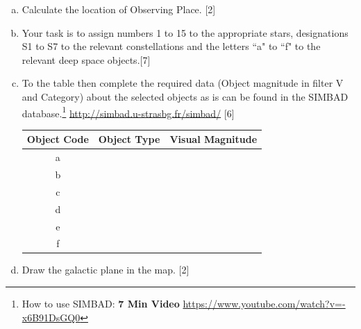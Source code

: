 \documentclass[a4paper,12pt]{extarticle}
\begin{document}
\begin{enumerate}[a.]
	\item Calculate the location of Observing Place. \hfill[2]
	\item Your task is to assign numbers 1 to 15 to the appropriate stars, designations S1 to S7 to the relevant constellations and the letters ``a" to ``f" to the relevant deep space objects.\hfill[7]
	\item To the table then complete the required data (Object magnitude in filter V and Category) about the selected objects as is can be found in the SIMBAD database.\footnote{How to use SIMBAD: \textbf{7 Min Video} \url{https://www.youtube.com/watch?v=-x6B91DsGQ0}} \url{http://simbad.u-strasbg.fr/simbad/} \hfill[6]
	
	\begin{table}[H]
		\centering
		\begin{tabular}{|c|l|l|}
			\hline
			\multicolumn{1}{|l|}{Object Code} & Object Type & Visual Magnitude \\ \hline
			a                                 &             &                  \\
			b                                 &             &                  \\
			c                                 &             &                  \\
			d                                 &             &                  \\
			e                                 &             &                  \\
			f                                 &             &                  \\ \hline
		\end{tabular}
	\end{table}
	
	\item Draw the galactic plane in the map. \hfill[2]
\end{enumerate}
\end{document}
